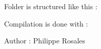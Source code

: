 Folder is structured like this \+:


\begin{DoxyCode}{0}

\end{DoxyCode}


Compilation is done with \+: 
\begin{DoxyCode}{0}

\end{DoxyCode}


Author \+: Philippe Rosales 